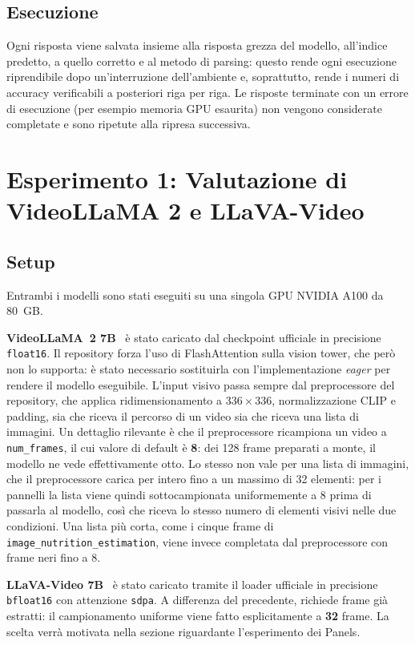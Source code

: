 \documentclass{article}
\begin{document}
\subsection{Esecuzione}

Ogni risposta viene salvata insieme
alla risposta grezza del modello, all'indice predetto, a quello corretto e al metodo di
parsing: questo rende ogni esecuzione riprendibile dopo un'interruzione
dell'ambiente e, soprattutto, rende i numeri di accuracy verificabili a
posteriori riga per riga. Le risposte terminate con un errore di esecuzione
(per esempio memoria GPU esaurita) non vengono considerate completate e sono
ripetute alla ripresa successiva.

\section{Esperimento 1: Valutazione di VideoLLaMA 2 e LLaVA-Video}
\label{sec:baseline}

\subsection{Setup}

Entrambi i modelli sono stati eseguiti su una singola GPU NVIDIA A100 da 80~GB.

\textbf{VideoLLaMA~2 7B}~\cite{videollama2} è stato caricato dal checkpoint
ufficiale in precisione \texttt{float16}. Il repository forza l'uso di
FlashAttention sulla vision tower, che però non lo supporta: è stato necessario
sostituirla con l'implementazione \emph{eager} per rendere il modello
eseguibile. L'input visivo passa sempre dal preprocessore del repository, che
applica ridimensionamento a $336\times336$, normalizzazione CLIP e padding, sia
che riceva il percorso di un video sia che riceva una lista di immagini. Un
dettaglio rilevante è che il preprocessore ricampiona un video a
\texttt{num\_frames}, il cui valore di default è \textbf{8}: dei 128 frame
preparati a monte, il modello ne vede effettivamente otto. Lo stesso non vale
per una lista di immagini, che il preprocessore carica per intero fino a un
massimo di 32 elementi: per i pannelli la lista viene quindi sottocampionata
uniformemente a 8 prima di passarla al modello, così che riceva lo stesso
numero di elementi visivi nelle due condizioni. Una lista più corta, come i
cinque frame di \texttt{image\_nutrition\_estimation}, viene invece completata
dal preprocessore con frame neri fino a 8.

\textbf{LLaVA-Video 7B}~\cite{llavavideo} è stato caricato tramite il loader
ufficiale in precisione \texttt{bfloat16} con attenzione \texttt{sdpa}. A
differenza del precedente, richiede frame già estratti: il campionamento
uniforme viene fatto esplicitamente a \textbf{32}
frame. La scelta verrà motivata nella sezione riguardante l'esperimento dei Panels.
\end{document}
